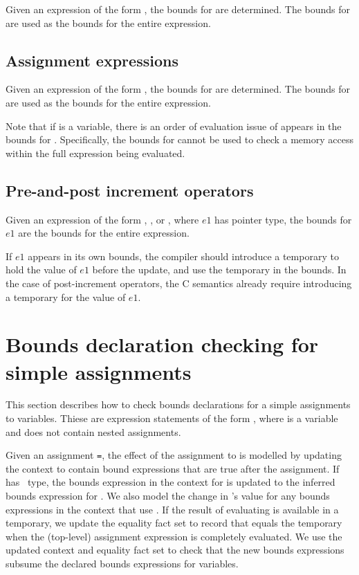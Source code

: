 Given an expression of the form  \code{,} , the
bounds for  are determined. The bounds for  are used
as the bounds for the entire expression.  

\subsection{Assignment expressions}

Given an expression of the form  \code{ = } , the
bounds for  are determined. The bounds for  are used
as the bounds for the entire expression.

Note that if  is a variable,
there is an order of evaluation issue of  appears in the bounds for
.   Specifically, the bounds for  cannot be used to
check a memory access within the full expression being evaluated.

\subsection{Pre-and-post increment operators}
\label{section:inferring-increment-bounds}

Given an expression of the form \code{++}, \code{--},
 \code{++} or \code{--}, where $e1$ has pointer type,
 the bounds for $e1$ are the bounds for the entire expression.
 
 If $e1$ appears in its own bounds, the compiler should introduce a
 temporary to hold the value of $e1$ before the update, and use
 the temporary in the bounds.  In the case of post-increment operators, 
 the C semantics already require  introducing a temporary for the value of $e1$.

\section{Bounds declaration checking for simple assignments}

This section describes how to check bounds declarations for a
simple assignments to variables.  Thiese are expression statements of the
form , where  is a variable and  does
not contain nested assignments.

Given an assignment \lstinline+=+, the effect of the assignment to 
is modelled by updating the context to contain bound expressions that are true
after the assignment.  If  has \arrayptr\ type, the bounds expression in
the context for  is updated to the inferred bounds expression for .
We also model the change in 's
value for any bounds expressions in the context that use .   If the result of 
evaluating  is available in a temporary, we update the equality fact set 
to record that  equals the temporary when the (top-level) assignment
expression is completely evaluated.
We use the updated context and equality fact set to check
that the new bounds expressions subsume the declared bounds expressions for variables.

